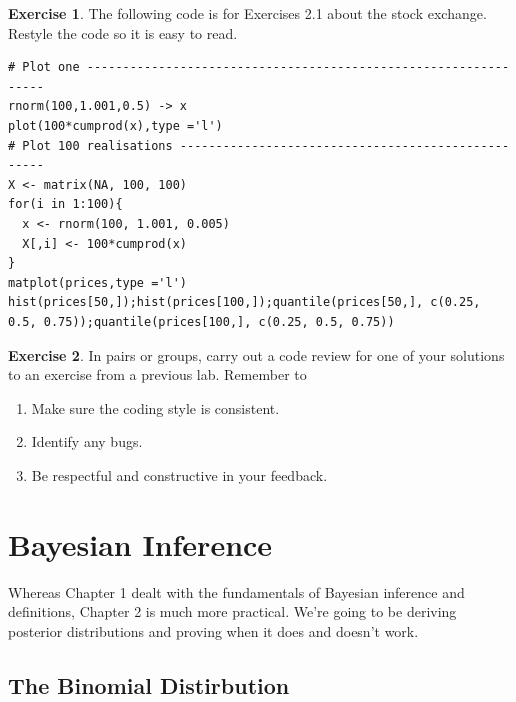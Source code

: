 \documentclass[
]{book}
\providecommand{\tightlist}{%
  \setlength{\itemsep}{0pt}\setlength{\parskip}{0pt}}
\theoremstyle{definition}
\theoremstyle{definition}
\theoremstyle{definition}
\newtheorem{exercise}{Exercise}[chapter]
\theoremstyle{definition}
\theoremstyle{remark}
\begin{document}
\begin{exercise}

The following code is for Exercises 2.1 about the stock exchange. Restyle the code so it is easy to read.

\begin{verbatim}
# Plot one ----------------------------------------------------------------
rnorm(100,1.001,0.5) -> x 
plot(100*cumprod(x),type ='l') 
# Plot 100 realisations ---------------------------------------------------
X <- matrix(NA, 100, 100) 
for(i in 1:100){
  x <- rnorm(100, 1.001, 0.005)
  X[,i] <- 100*cumprod(x)
}
matplot(prices,type ='l')
hist(prices[50,]);hist(prices[100,]);quantile(prices[50,], c(0.25, 0.5, 0.75));quantile(prices[100,], c(0.25, 0.5, 0.75))
\end{verbatim}

\end{exercise}

\begin{exercise}

In pairs or groups, carry out a code review for one of your solutions to an exercise from a previous lab. Remember to

\begin{enumerate}
\def\labelenumi{\arabic{enumi}.}
\tightlist
\item
  Make sure the coding style is consistent.
\item
  Identify any bugs.
\item
  Be respectful and constructive in your feedback.
\end{enumerate}

\end{exercise}

\hypertarget{bayesian-inference}{%
\chapter{Bayesian Inference}\label{bayesian-inference}}

Whereas Chapter 1 dealt with the fundamentals of Bayesian inference and definitions, Chapter 2 is much more practical. We're going to be deriving posterior distributions and proving when it does and doesn't work.

\hypertarget{the-binomial-distirbution}{%
\section{The Binomial Distirbution}\label{the-binomial-distirbution}}
\end{document}

